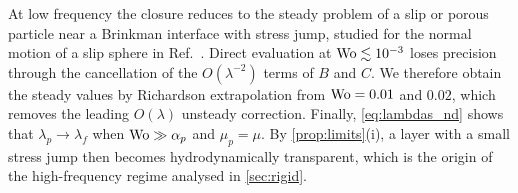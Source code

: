 At low frequency the closure reduces to the steady problem of a slip or porous particle near a Brinkman interface with
stress jump, studied for the normal motion of a slip sphere in Ref.~. Direct
evaluation at $\mathrm{Wo}\lesssim10^{-3}$ loses precision through the cancellation of the $O(\lambda^{-2})$ terms of $B$ and $C$.
We therefore obtain the steady values by Richardson extrapolation from $\mathrm{Wo}=0.01$ and $0.02$, which removes the leading
$O(\lambda)$ unsteady correction. Finally, \cref{eq:lambdas_nd} shows that $\lambda_p\to\lambda_f$ when $\mathrm{Wo}\gg\alpha_p$
and $\mu_p=\mu$. By \cref{prop:limits}(i), a layer with a small stress jump then becomes hydrodynamically transparent,
which is the origin of the high-frequency regime analysed in \cref{sec:rigid}.
